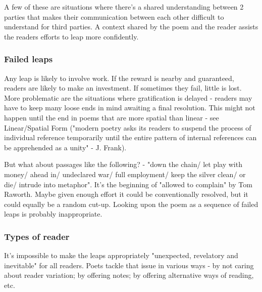 \documentclass[11pt]{article}
\begin{document}
A few of these are situations where there's a shared understanding between 2 parties that makes their communication between each other difficult to understand for third parties. A context shared by the poem and the reader assists the readers efforts to leap more confidently.

\subsubsection*{Failed leaps}

Any leap is likely to involve work. If the reward is nearby and guaranteed, readers are likely to make an investment. If sometimes they fail, little is lost. More problematic are the situations where gratification is delayed - readers may have to keep many loose ends in mind awaiting a final resolution. This might not happen until the end in poems that are more spatial than linear - see Linear/Spatial Form ("modern poetry asks its readers to suspend the process of individual reference temporarily until the entire pattern of internal references can be apprehended as a unity" - J. Frank).

But what about passages like the following? - "down the chain/ let play with money/ ahead in/ undeclared war/ full employment/ keep the silver clean/ or die/ intrude into metaphor". It's the beginning of "allowed to complain" by Tom Raworth. Maybe given enough effort it could be conventionally resolved, but it could equally be a random cut-up. Looking upon the poem as a sequence of failed leaps is probably inappropriate.

\subsubsection*{Types of reader}

It's impossible to make the leaps appropriately "unexpected, revelatory and inevitable" for all readers. Poets tackle that issue in various ways - by not caring about reader variation; by offering notes; by offering alternative ways of reading, etc.
\end{document}
